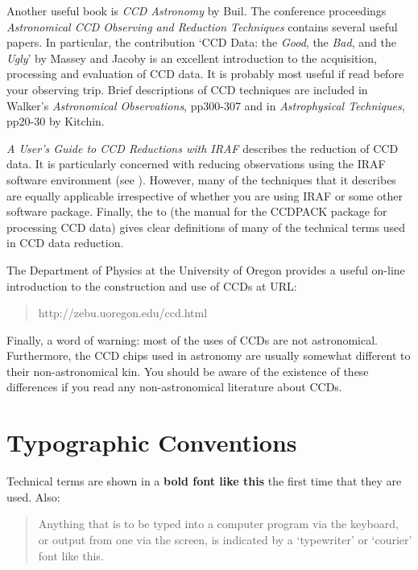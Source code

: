 \documentclass[twoside,11pt]{starlink}
\begin{document}
Another useful book is \textit{CCD Astronomy}\/ by Buil\cite{BUIL91}.  The
conference proceedings \textit{Astronomical CCD Observing and Reduction
Techniques}\/\cite{HOWELL92} contains several useful papers.  In
particular, the contribution `CCD Data: the \textit{Good}, the \textit{Bad},
and the \textit{Ugly}' by Massey and Jacoby\cite{MASSEY92} is an excellent
introduction to the acquisition, processing and evaluation of CCD data.
It is probably most useful if read before your observing trip.  Brief
descriptions of CCD techniques are included in Walker's \textit{Astronomical
Observations}\/\cite{WALKER87}, pp300-307 and in \textit{Astrophysical
Techniques}\/\cite{KITCHIN98}, pp20-30 by Kitchin.

\textit{A User's Guide to CCD Reductions with IRAF}\/\cite{MASSEY97}
describes the reduction of CCD data.  It is particularly concerned with
reducing observations using the IRAF software environment (see
\/\cite{SG12}).  However, many of the techniques
that it describes are equally applicable irrespective of whether you are
using IRAF or some other software package.  Finally, the
 to \/\cite{SUN139}
(the manual for the CCDPACK package for processing CCD data) gives clear
definitions of many of the technical terms used in CCD data reduction.

The Department of Physics at the University of Oregon provides a useful
on-line introduction to the construction and use of CCDs at URL:

\begin{quote}
{http://zebu.uoregon.edu/ccd.html}
\end{quote}

Finally, a word of warning: most of the uses of CCDs are not astronomical.
Furthermore, the CCD chips used in astronomy are usually somewhat different
to their non-astronomical kin.  You should be aware of the existence of
these differences if you read any non-astronomical literature about CCDs.


\section{\label{TYPO}Typographic Conventions}

Technical terms are shown in a \textbf{bold font like this} the first
time that they are used.  Also:

\begin{quote}
\begin{terminalv}
Anything that is to be typed into a computer program via the keyboard,
or output from one via the screen, is indicated by a `typewriter' or
`courier' font like this.
\end{terminalv}
\end{quote}
\end{document}
